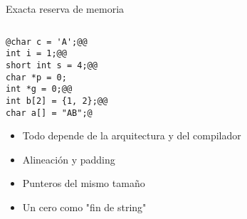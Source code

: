 \begin{frame}[fragile,label=RM]{Exacta reserva de memoria}
   \begin{columns}
      \begin{column}{.55\linewidth}
         \begin{lstlisting}[style=dimmided]
@char c = 'A';@@
int i = 1;@@
short int s = 4;@@
char *p = 0;
int *g = 0;@@
int b[2] = {1, 2};@@
char a[] = "AB";@
         \end{lstlisting}
   \begin{itemize}
      \item<1-> Todo depende de la arquitectura y del compilador
      \item<2-> Alineaci\'on y padding
      \item<4-> Punteros del mismo tama\~no
      \item<6-> Un cero como "fin de string"
   \end{itemize}

      \end{column}
      \begin{column}{.05\linewidth}
      \end{column}
      \begin{column}{.30\linewidth}
~%
         \begin{tikzpicture}[cell/.style={rectangle,draw=black},
            space/.style={minimum height=1.5em,matrix of nodes,row sep=-\pgflinewidth,column sep=-\pgflinewidth,column 1/.style={font=\ttfamily}},text depth=0.5ex,text height=2ex,nodes in empty cells]


\end{tikzpicture}
\end{column}
\end{columns}
\end{frame}
